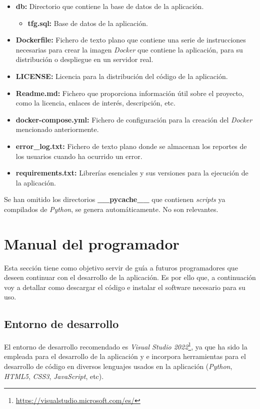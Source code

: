 \begin{itemize}
\begin{itemize}
    \end{itemize}
    \item \textbf{db:} Directorio que contiene la base de datos de la aplicación.
    \begin{itemize}
        \item \textbf{tfg.sql:} Base de datos de la aplicación.
    \end{itemize}
    \item \textbf{Dockerfile:} Fichero de texto plano que contiene una serie de instrucciones necesarias para crear la imagen \textit{Docker} que contiene la aplicación, para su distribución o despliegue en un servidor real.
    \item \textbf{LICENSE:} Licencia para la  distribución del código de la aplicación.
    \item \textbf{Readme.md:} Fichero que proporciona información útil sobre el proyecto, como la licencia, enlaces de interés, descripción, etc.
    \item \textbf{docker-compose.yml:} Fichero de configuración para la creación del \textit{Docker} mencionado anteriormente.
    \item \textbf{error\_log.txt:} Fichero de texto plano donde se almacenan los reportes de los usuarios cuando ha ocurrido un error.
    \item \textbf{requirements.txt:} Librerías esenciales y sus versiones para la ejecución de la aplicación.
\end{itemize}

Se han omitido los directorios \textbf{\_\_pycache\_\_} que contienen \textit{scripts} ya compilados de \textit{Python}, se genera automáticamente. No son relevantes.


\section{Manual del programador}

Esta sección tiene como objetivo servir de guía a futuros programadores que deseen continuar con el desarrollo de la aplicación. Es por ello que, a continuación voy a detallar como descargar el código e instalar el software necesario para su uso.

\subsection{Entorno de desarrollo}

El entorno de desarrollo recomendado es \textit{Visual Studio 2022}\footnote{\url{https://visualstudio.microsoft.com/es/}}, ya que ha sido la empleada para el desarrollo de la aplicación y e incorpora herramientas para el desarrollo de código en diversos lenguajes usados en la aplicación (\textit{Python}, \textit{HTML5}, \textit{CSS3}, \textit{JavaScript}, etc). 

